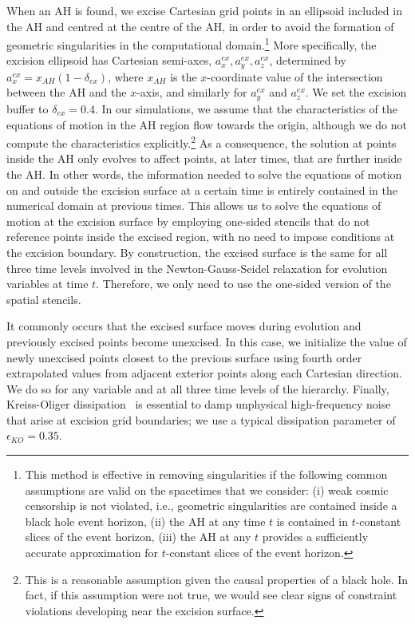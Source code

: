 \documentclass[a4paper,11pt]{article}
\numberwithin{equation}{section}
\begin{document}
When an AH is found, we excise Cartesian grid points in an ellipsoid included in the AH and centred at the centre of the AH, in order to avoid the formation of geometric singularities in the computational domain.\footnote{This method is effective in removing singularities if the following common assumptions are valid on the spacetimes that we consider: (i) weak cosmic censorship is not violated, i.e., geometric singularities are contained inside a black hole event horizon, (ii) the AH at any time $t$ is contained in $t$-constant slices of the event horizon, (iii) the AH at any $t$ provides a sufficiently accurate approximation for $t$-constant slices of the event horizon.}
More specifically, the excision ellipsoid has Cartesian semi-axes, $a_x^{ex},a_y^{ex},a_z^{ex}$, determined by $a_x^{ex}=x_{AH}(1-\delta_{ex})$, where $x_{AH}$ is the $x$-coordinate value of the intersection between the AH and the $x$-axis, and similarly for $a_y^{ex}$ and $a_z^{ex}$. We set the excision buffer to $\delta_{ex}=0.4$. 
In our simulations, we assume that the characteristics of the equations of motion in the AH region flow towards the origin, although we do not compute the characteristics explicitly.\footnote{This is a reasonable assumption given the causal properties of a black hole. In fact, if this assumption were not true, we would see clear signs of constraint violations developing near the excision surface.} As a consequence, the solution at points inside the AH only evolves to affect points, at later times, that are further inside the AH. In other words, the information needed to solve the equations of motion on and outside the excision surface at a certain time is entirely contained in the numerical domain at previous times. This allows us to solve the equations of motion at the excision surface by employing one-sided stencils that do not reference points inside the excised region, with no need to impose conditions at the excision boundary. By construction, the excised surface is the same for all three time levels involved in the Newton-Gauss-Seidel relaxation for evolution variables at time $t$. Therefore, we only need to use the one-sided version of the spatial stencils. 

It commonly occurs that the excised surface moves during evolution and previously excised points become unexcised. In this case, we initialize the value of newly unexcised points closest to the previous surface using  fourth order extrapolated values from adjacent exterior points along each Cartesian direction. We do so for any variable and at all three time levels of the hierarchy.
Finally, Kreiss-Oliger dissipation~\cite{kreiss1973methods} is essential to damp unphysical high-frequency noise that arise at excision grid boundaries; we use a typical dissipation parameter of $\epsilon_{KO}=0.35$.
\end{document}
